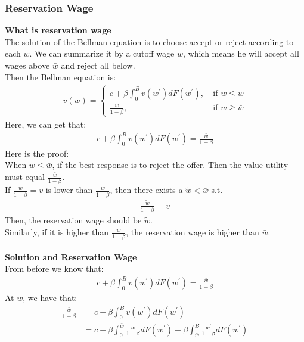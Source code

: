 \documentclass{article}
\begin{document}
\subsubsection{Reservation Wage}
\textbf{What is reservation wage}\\
The solution of the Bellman equation is to choose accept or reject according to each $w$. We can summarize it by a cutoff wage $\bar{w}$, which means he will accept all wages above $\bar{w}$ and reject all below.\\
Then the Bellman equation is:
\begin{align*}
	v(w) = 
	\left\{
			\begin{array}{lr}
				c + \beta \int^B_0 v(w^\prime)dF(w^\prime),\ &\text{if $w \leq \bar{w}$}\\
				\frac{w}{1 - \beta},\  &\text{if $w \geq \bar{w}$}
			\end{array}
	\right.	
\end{align*}
Here, we can get that:
\begin{align*}
	c + \beta \int^B_0 v(w^\prime)dF(w^\prime) = \frac{\bar{w}}{1 - \beta}
\end{align*}
Here is the proof:\\
\indent When $w \leq \bar{w}$, if the best response is to reject the offer. Then the value utility must equal $\frac{\bar{w}}{1 - \beta}$.\\
\indent If  $\frac{\bar{w}}{1 - \beta} = v$ is lower than $\frac{\bar{w}}{1 - \beta}$, then there exists a $\tilde{w} < \bar{w}$ s.t.
\begin{align*}
	\frac{\tilde{w}}{1 - \beta} = v
\end{align*} 
\indent Then, the reservation wage should be $\tilde{w}$.\\
\indent Similarly, if it is higher than $\frac{\bar{w}}{1 - \beta}$, the reservation wage is higher than $\bar{w}$.\\\\
\textbf{Solution and Reservation Wage}\\
From before we know that:
\begin{align*}
	c + \beta \int^B_0 v(w^\prime)dF(w^\prime) = \frac{\bar{w}}{1 - \beta}
\end{align*}
At $\bar{w}$, we have that:
\begin{align*}
	\frac{\bar{w}}{1 - \beta} & = c + \beta \int^B_0 v(w^\prime)dF(w^\prime)\\
	& = c + \beta \int^{\bar{w}}_0 \frac{\bar{w}}{1 - \beta} dF(w^\prime) + \beta \int^B_{\bar{w}} \frac{w^\prime}{1 - \beta} dF(w^\prime)
\end{align*}
\end{document}
